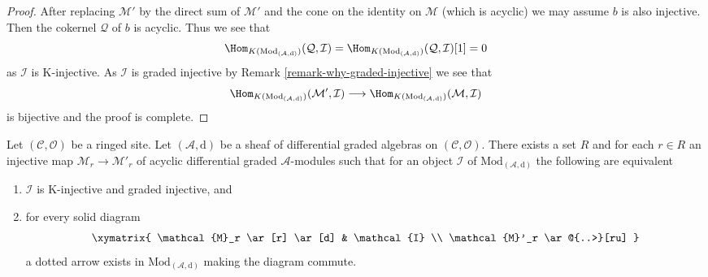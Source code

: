 \begin{proof}
After replacing $\mathcal{M}'$ by the direct sum of $\mathcal{M}'$
and the cone on the identity on $\mathcal{M}$ (which is acyclic)
we may assume $b$ is also injective. Then the cokernel $\mathcal{Q}$
of $b$ is acyclic. Thus we see that
$$
\Hom_{K(\text{Mod}_{(\mathcal{A}, \text{d})})}(\mathcal{Q}, \mathcal{I}) =
\Hom_{K(\text{Mod}_{(\mathcal{A}, \text{d})})}(\mathcal{Q}, \mathcal{I})[1] = 0
$$
as $\mathcal{I}$ is K-injective. As $\mathcal{I}$ is graded injective
by Remark \ref{remark-why-graded-injective}
we see that
$$
\Hom_{K(\text{Mod}_{(\mathcal{A}, \text{d})})}(\mathcal{M}', \mathcal{I})
\longrightarrow
\Hom_{K(\text{Mod}_{(\mathcal{A}, \text{d})})}(\mathcal{M}, \mathcal{I})
$$
is bijective and the proof is complete.
\end{proof}

\begin{lemma}
\label{lemma-better-set-of-monos}
Let $(\mathcal{C}, \mathcal{O})$ be a ringed site.
Let $(\mathcal{A}, \text{d})$
be a sheaf of differential graded algebras on $(\mathcal{C}, \mathcal{O})$.
There exists a set $R$ and for each $r \in R$ an injective map
$\mathcal{M}_r \to \mathcal{M}'_r$ of
acyclic differential graded $\mathcal{A}$-modules
such that for an object $\mathcal{I}$ of $\text{Mod}_{(\mathcal{A}, \text{d})}$
the following are equivalent
\begin{enumerate}
\item $\mathcal{I}$ is K-injective and graded injective, and
\item for every solid diagram
$$
\xymatrix{
\mathcal{M}_r \ar[r] \ar[d] & \mathcal{I} \\
\mathcal{M}'_r \ar@{..>}[ru]
}
$$
a dotted arrow exists in $\text{Mod}_{(\mathcal{A}, \text{d})}$
making the diagram commute.
\end{enumerate}
\end{lemma}

